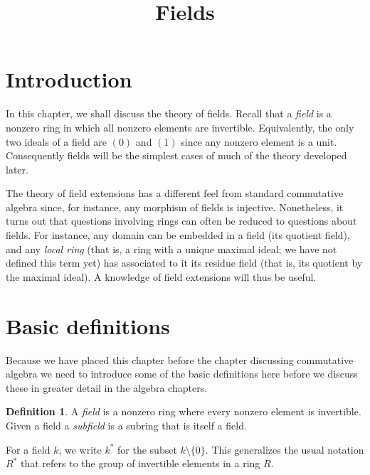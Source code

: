 \documentclass{stacks-project}
\theoremstyle{plain}
\theoremstyle{definition}
\newtheorem{definition}[subsection]{Definition}
\theoremstyle{remark}
\numberwithin{equation}{subsection}
\begin{document}
\title{Fields}


\maketitle

\label{section-phantom}

\tableofcontents


\section{Introduction}
\label{section-introduction}

\noindent
In this chapter, we shall discuss the theory of fields. Recall that a
{\it field} is a nonzero ring in which all nonzero elements are invertible.
Equivalently, the only two ideals of a field are $(0)$ and $(1)$
since any nonzero element is a unit. Consequently fields will be the
simplest cases of much of the theory developed later.

\medskip\noindent
The theory of field extensions has a different feel from standard commutative
algebra since, for instance, any morphism of fields is injective. Nonetheless,
it turns out that questions involving rings can often be reduced to questions
about fields. For instance, any domain can be embedded in a field
(its quotient field), and any {\it local ring} (that is, a ring with a unique
maximal ideal; we have not defined this term yet) has associated to it its
residue field (that is, its quotient by the maximal ideal).
A knowledge of field extensions will thus be useful.




\section{Basic definitions}
\label{section-definitions}

\noindent
Because we have placed this chapter before the chapter discussing
commutative algebra we need to introduce some of the basic definitions
here before we discuss these in greater detail in the algebra chapters.

\begin{definition}
\label{definition-field}
A {\it field} is a nonzero ring where every nonzero element is invertible.
Given a field a {\it subfield} is a subring that is itself a field.
\end{definition}

\noindent
For a field $k$, we write $k^*$ for the subset $k \setminus \{0\}$.
This generalizes the usual notation $R^*$ that refers to the group of
invertible elements in a ring $R$.
\end{document}
